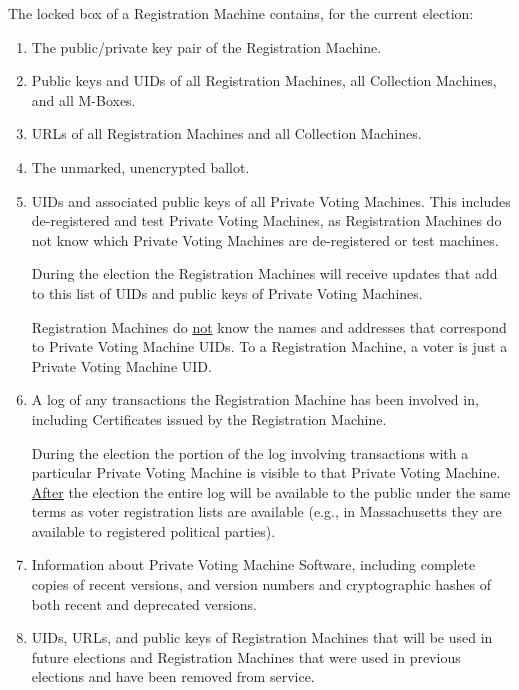 \documentclass[12pt]{article}
\begin{document}
The locked box of a Registration Machine contains, for the
current election:
\begin{enumerate}
\item The public/private key pair of the Registration Machine.
\item Public keys and UIDs of all Registration Machines, all Collection
Machines, and all M-Boxes.
\item URLs of all Registration Machines and all Collection Machines.
\item The unmarked, unencrypted ballot.
\item UIDs and associated public keys of all Private Voting
Machines.  This includes de-registered and test Private Voting
Machines, as Registration Machines do not know which Private Voting
Machines are de-registered or test machines.

During the election the Registration Machines will receive updates
that add to this list of UIDs and public keys of Private Voting
Machines.

Registration Machines do \underline{not} know the names and addresses that
correspond to Private Voting Machine UIDs.  To a Registration
Machine, a voter is just a Private Voting Machine UID.

\item A log of any transactions the Registration Machine has
been involved in, including  Certificates issued by the Registration Machine.

During the election the portion of the log involving transactions with
a particular Private Voting Machine is visible to that Private Voting
Machine.  \underline{After} the election the entire log will be available
to the public under the same terms as voter registration lists are
available (e.g., in Massachusetts they are available to registered
political parties).
\item Information about Private Voting Machine Software, including
complete copies of recent versions, and version numbers and
cryptographic hashes of both recent and deprecated versions.
\item UIDs, URLs, and public keys of Registration Machines that will be used
in future elections and Registration Machines that were used in previous
elections and have been removed from service.
\end{enumerate}
\end{document}
